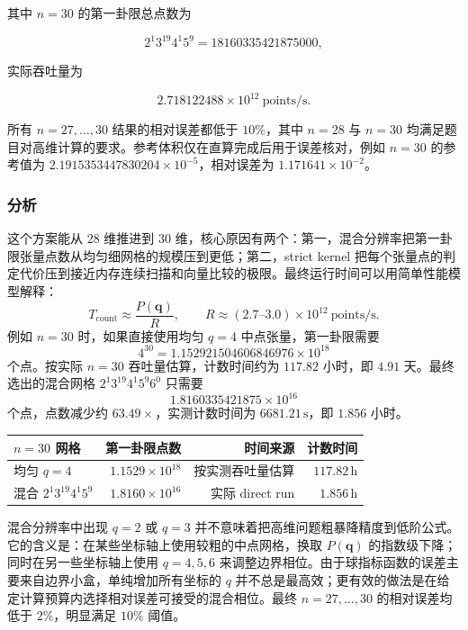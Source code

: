 \documentclass[12pt,a4paper,fontset=none]{ctexart}
\begin{document}
其中 \(n=30\) 的第一卦限总点数为

\[
2^1 3^{19}4^1 5^9=18160335421875000,
\]

实际吞吐量为

\[
2.718122488\times 10^{12}\ \text{points/s}.
\]

所有 \(n=27,\ldots,30\) 结果的相对误差都低于 \(10\%\)，其中 \(n=28\) 与 \(n=30\) 均满足题目对高维计算的要求。参考体积仅在直算完成后用于误差核对，例如 \(n=30\) 的参考值为 \(2.1915353447830204\times10^{-5}\)，相对误差为 \(1.171641\times10^{-2}\)。

\subsubsection{分析}\label{ux5206ux6790-10}

这个方案能从 \(28\) 维推进到 \(30\) 维，核心原因有两个：第一，混合分辨率把第一卦限张量点数从均匀细网格的规模压到更低；第二，strict kernel 把每个张量点的判定代价压到接近内存连续扫描和向量比较的极限。最终运行时间可以用简单性能模型解释：
\[
T_{\mathrm{count}}\approx \frac{P(\mathbf q)}{R},\qquad
R\approx (2.7\text{--}3.0)\times10^{12}\ \text{points/s}.
\]
例如 \(n=30\) 时，如果直接使用均匀 \(q=4\) 中点张量，第一卦限需要
\[
4^{30}=1.152921504606846976\times10^{18}
\]
个点。按实际 \(n=30\) 吞吐量估算，计数时间约为 \(117.82\) 小时，即
\(4.91\) 天。最终选出的混合网格
\(2^1 3^{19}4^1 5^9 6^0\) 只需要
\[
1.8160335421875\times10^{16}
\]
个点，点数减少约 \(63.49\times\)，实测计数时间为 \(6681.21\,\mathrm{s}\)，即
\(1.856\) 小时。

\begin{table}[H]
  \centering
  \small
  \setlength{\tabcolsep}{4pt}
  \begin{tabular}{l r r r}
    \toprule
    \(n=30\) 网格 & 第一卦限点数 & 时间来源 & 计数时间 \\
    \midrule
    均匀 \(q=4\) & \(1.1529\times10^{18}\) & 按实测吞吐量估算 & \(117.82\,\mathrm{h}\) \\
    混合 \(2^1 3^{19}4^1 5^9\) & \(1.8160\times10^{16}\) & 实际 direct run & \(1.856\,\mathrm{h}\) \\
    \bottomrule
  \end{tabular}
\end{table}

混合分辨率中出现 \(q=2\) 或 \(q=3\) 并不意味着把高维问题粗暴降精度到低阶公式。它的含义是：在某些坐标轴上使用较粗的中点网格，换取 \(P(\mathbf q)\) 的指数级下降；同时在另一些坐标轴上使用 \(q=4,5,6\) 来调整边界相位。由于球指标函数的误差主要来自边界小盒，单纯增加所有坐标的 \(q\) 并不总是最高效；更有效的做法是在给定计算预算内选择相对误差可接受的混合相位。最终 \(n=27,\ldots,30\) 的相对误差均低于 \(2\%\)，明显满足 \(10\%\) 阈值。
\end{document}
